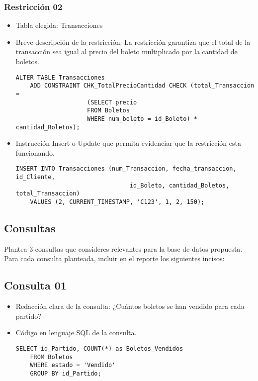 \subsubsection*{Restricción 02}
\begin{itemize}
    \item Tabla elegida: Transacciones
    \item Breve descripción de la restricción: La restricción garantiza que el total de la transacción sea igual al precio del boleto multiplicado por la cantidad de boletos.
    
    \begin{lstlisting}[caption={Tablas para la BdDatos}, label={lst:sql_estadios}]
    ALTER TABLE Transacciones
    ADD CONSTRAINT CHK_TotalPrecioCantidad CHECK (total_Transaccion = 
                    (SELECT precio 
                    FROM Boletos 
                    WHERE num_boleto = id_Boleto) * cantidad_Boletos);        
    \end{lstlisting}

    \item Instrucción Insert o Update que permita evidenciar que la restricción esta funcionando.
    
    \begin{lstlisting}[caption={Tablas para la BdDatos}, label={lst:sql_estadios}]
    INSERT INTO Transacciones (num_Transaccion, fecha_transaccion, id_Cliente, 
                                id_Boleto, cantidad_Boletos, total_Transaccion)
    VALUES (2, CURRENT_TIMESTAMP, 'C123', 1, 2, 150);     
    \end{lstlisting}    
\end{itemize}

\subsection{Consultas}

Plantea 3 consultas que consideres relevantes para la base de datos propuesta. Para cada consulta planteada, incluir en el reporte los siguientes incisos:


\subsection*{Consulta 01}

\begin{itemize}
    \item Redacción clara de la consulta: ¿Cuántos boletos se han vendido para cada partido?
    \item Código en lenguaje SQL de la consulta.
    \begin{lstlisting}[caption={Tablas para la BdDatos}, label={lst:sql_estadios}]
    SELECT id_Partido, COUNT(*) as Boletos_Vendidos
    FROM Boletos
    WHERE estado = 'Vendido'
    GROUP BY id_Partido;    
    \end{lstlisting}    
        
\end{itemize}


